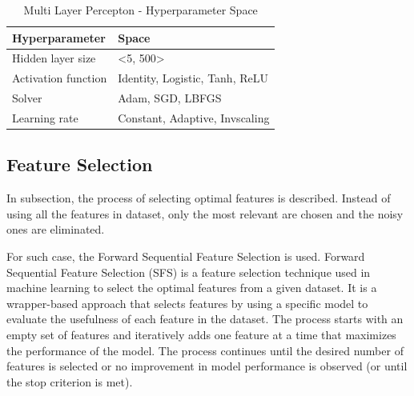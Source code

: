        \begin{table}[H]
            \small
            \setlength{\tabcolsep}{8pt}
            \renewcommand{\arraystretch}{1.3}
            \centering
                \caption[Multi Layer Percepton - Hyperparameter Space]{Multi Layer Percepton - Hyperparameter Space}\label{tab:mlpspace}
                \begin{tabular}{ll}
            \toprule
            \textbf{Hyperparameter} & \textbf{Space}\\
            \midrule
            \hline
            Hidden layer size & <5, 500> \\
            Activation function & Identity, Logistic, Tanh, ReLU \\
            Solver & Adam, SGD, LBFGS \\
            Learning rate & Constant, Adaptive, Invscaling \\
            \hline
            \bottomrule
            \end{tabular}
            \vspace{0.7em}
        
            \vspace{-1em}
        \end{table}
        
        \subsection{Feature Selection}
        \label{subsec:feature-selection}
        
        In subsection, the process of selecting optimal features is described. Instead of using all the features in dataset, only the most relevant are chosen and the noisy ones are eliminated.
        
        For such case, the Forward Sequential Feature Selection is used.
        Forward Sequential Feature Selection (SFS) is a feature selection technique used in machine learning to select the optimal features from a given dataset.
        It is a wrapper-based approach that selects features by using a specific model to evaluate the usefulness of each feature in the dataset.
        The process starts with an empty set of features and iteratively adds one feature at a time that maximizes the performance of the model.
        The process continues until the desired number of features is selected or no improvement in model performance is observed (or until the stop criterion is met).
        
